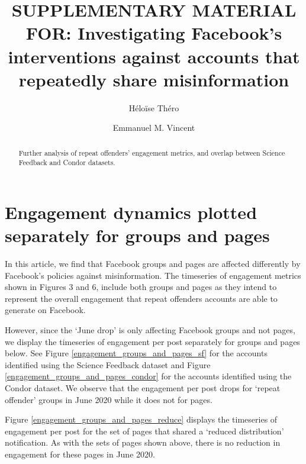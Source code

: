 \documentclass[review]{elsarticle}
\newcommand{\beginsupplement}{%
        \setcounter{table}{0}
        \renewcommand{\thetable}{S\arabic{table}}%
        \setcounter{figure}{0}
        \renewcommand{\thefigure}{S\arabic{figure}}%
     }
\begin{document}
\begin{frontmatter}

\title{SUPPLEMENTARY MATERIAL FOR: \newline
Investigating Facebook's interventions against accounts that repeatedly share misinformation}

\author[mymainaddress]{Héloïse Théro}

\author[mymainaddress]{Emmanuel M. Vincent}

\address[mymainaddress]{médialab - Sciences Po, Paris, France}

\begin{abstract}

Further analysis of repeat offenders' engagement metrics, and overlap between Science Feedback and Condor datasets.

\end{abstract}

\end{frontmatter}

\beginsupplement

\section*{Engagement dynamics plotted separately for groups and pages}

In this article, we find that Facebook groups and pages are affected differently by Facebook’s policies against misinformation.
The timeseries of engagement metrics shown in Figures 3 and 6, include both groups and pages as they intend to represent the overall engagement that repeat offenders accounts are able to generate on Facebook.

However, since the `June drop’ is only affecting Facebook groups and not pages, we display the timeseries of engagement per post separately for groups and pages below. See Figure \ref{engagement_groups_and_pages_sf} for the accounts identified using the Science Feedback dataset and Figure \ref{engagement_groups_and_pages_condor} for the accounts identified using the Condor dataset. 
We observe that the engagement per post drops for `repeat offender' groups in June 2020 while it does not for pages.

Figure \ref{engagement_groups_and_pages_reduce} displays the timeseries of engagement per post for the set of pages that shared a `reduced distribution' notification.
As with the sets of pages shown above, there is no reduction in engagement for these pages in June 2020.
\end{document}
